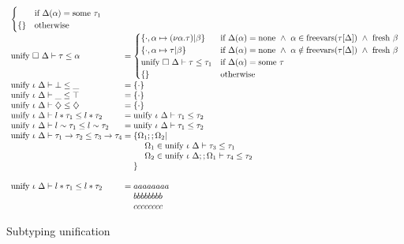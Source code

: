 \documentclass[sigplan,screen]{acmart}
\begin{document}
\begin{figure*}[h]
\[\begin{array}{l @{} l}
\begin{cases}
        &\text{if }
        \Delta(\alpha) = \text{some } \tau_1
        \\
        \{\}
        &\text{otherwise}
      \end{cases}
      \\
      \text{unify } \square\ \Delta \vdash \tau \leq \alpha	
      &{} =
      \begin{cases}  
        \{ \cdot,\alpha \mapsto (\nu\alpha.\tau)|\beta \}
        & \text{if } 
        \Delta(\alpha) = \text{none} \ \wedge\ 
        \alpha \in \text{freevars}(\tau[\Delta]) \ \wedge\ 
        \text{fresh } \beta
        \\
        \{ \cdot,\alpha \mapsto \tau|\beta \}
        & \text{if } 
        \Delta(\alpha) = \text{none} \ \wedge\ 
        \alpha \notin \text{freevars}(\tau[\Delta]) \ \wedge\ 
        \text{fresh } \beta
        \\
        \text{unify } \square\ \Delta \vdash \tau \leq \tau_1
        &\text{if }
        \Delta(\alpha) = \text{some } \tau
        \\
        \{\}
        &\text{otherwise}
      \end{cases}
      \\
      \text{unify } \iota\ \Delta \vdash \bot \leq \_	
      &{} = 
      \{\cdot\}
      \\
      \text{unify } \iota\ \Delta \vdash \_ \leq \top	
      &{} = 
      \{\cdot\}
      \\
      \text{unify } \iota\ \Delta \vdash \diamondsuit \leq \diamondsuit	
      &{} = 
      \{\cdot\}
      \\
      \text{unify } \iota\ \Delta \vdash l*\tau_1 \leq l*\tau_2	
      &{} = 
      \text{unify } \iota\ \Delta \vdash \tau_1 \leq \tau_2
      \\
      \text{unify } \iota\ \Delta \vdash l\sim\tau_1 \leq l\sim\tau_2	
      &{} = 
      \text{unify } \iota\ \Delta \vdash \tau_1 \leq \tau_2
      \\
      \text{unify } \iota\ \Delta \vdash \tau_1\rightarrow\tau_2 \leq \tau_3\rightarrow\tau_4	
      &{} = 
      \begin{array}[t]{@{} l}
        \{\Omega_1;;\Omega_2 |
        \\ 
        \ \ \ \ \Omega_1 \in \text{unify } \iota\ \Delta \vdash \tau_3 \leq \tau_1
        \\
        \ \ \ \ \Omega_2 \in \text{unify } \iota\ \Delta;;\Omega_1 \vdash \tau_4 \leq \tau_2
        \\
        \}
      \end{array}
      \\
      \\
      \text{unify } \iota\ \Delta \vdash l*\tau_1 \leq l*\tau_2	
      &{} = 
      \begin{array}[t]{@{} l}
        aaaaaaaa
        \\
        bbbbbbbb
        \\
        cccccccc
      \end{array}
    \end{array}
  \]

  \caption{Subtyping unification}
\end{figure*}
\end{document}

